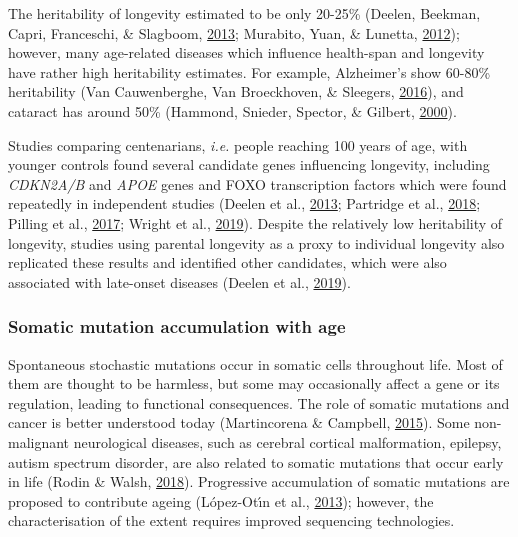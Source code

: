 \documentclass[12pt,twoside]{unicam}
\begin{document}
The heritability of longevity estimated to be only 20-25\% (Deelen, Beekman, Capri, Franceschi, \& Slagboom, \protect\hyperlink{ref-Deelen2013}{2013}; Murabito, Yuan, \& Lunetta, \protect\hyperlink{ref-Murabito2012}{2012}); however, many age-related diseases which influence health-span and longevity have rather high heritability estimates. For example, Alzheimer's show 60-80\% heritability (Van Cauwenberghe, Van Broeckhoven, \& Sleegers, \protect\hyperlink{ref-VanCauwenberghe2016}{2016}), and cataract has around 50\% (Hammond, Snieder, Spector, \& Gilbert, \protect\hyperlink{ref-Hammond2000}{2000}).

Studies comparing centenarians, \emph{i.e.} people reaching 100 years of age, with younger controls found several candidate genes influencing longevity, including \emph{CDKN2A/B} and \emph{APOE} genes and FOXO transcription factors which were found repeatedly in independent studies (Deelen et al., \protect\hyperlink{ref-Deelen2013}{2013}; Partridge et al., \protect\hyperlink{ref-Partridge2018}{2018}; Pilling et al., \protect\hyperlink{ref-Pilling2017}{2017}; Wright et al., \protect\hyperlink{ref-Wright2019}{2019}). Despite the relatively low heritability of longevity, studies using parental longevity as a proxy to individual longevity also replicated these results and identified other candidates, which were also associated with late-onset diseases (Deelen et al., \protect\hyperlink{ref-Deelen2019}{2019}).

\hypertarget{somatic-mutation-accumulation-with-age}{%
\subsubsection{Somatic mutation accumulation with age}\label{somatic-mutation-accumulation-with-age}}

Spontaneous stochastic mutations occur in somatic cells throughout life. Most of them are thought to be harmless, but some may occasionally affect a gene or its regulation, leading to functional consequences. The role of somatic mutations and cancer is better understood today (Martincorena \& Campbell, \protect\hyperlink{ref-Martincorena2015}{2015}). Some non-malignant neurological diseases, such as cerebral cortical malformation, epilepsy, autism spectrum disorder, are also related to somatic mutations that occur early in life (Rodin \& Walsh, \protect\hyperlink{ref-Rodin2018}{2018}). Progressive accumulation of somatic mutations are proposed to contribute ageing (López-Otı́n et al., \protect\hyperlink{ref-Lopez-Otin2013}{2013}); however, the characterisation of the extent requires improved sequencing technologies.
\end{document}
